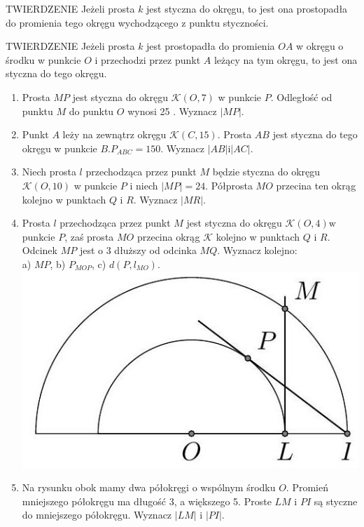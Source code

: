 \documentclass[10pt]{article}
\begin{document}
TWIERDZENIE Jeżeli prosta \(k\) jest styczna do okręgu, to jest ona prostopadła do promienia tego okręgu wychodzącego z punktu styczności.

TWIERDZENIE Jeżeli prosta \(k\) jest prostopadła do promienia \(O A\) w okręgu o środku w punkcie \(O\) i przechodzi przez punkt \(A\) leżący na tym okręgu, to jest ona styczna do tego okręgu.

\begin{enumerate}
  \item Prosta \(M P\) jest styczna do okręgu \(\mathcal{K}(O, 7)\) w punkcie \(P\). Odległość od punktu \(M\) do punktu \(O\) wynosi 25 . Wyznacz \(|M P|\).
  \item Punkt \(A\) leży na zewnątrz okręgu \(\mathcal{K}(C, 15)\). Prosta \(A B\) jest styczna do tego okręgu w punkcie \(B . P_{A B C}=150\). Wyznacz \(|A B| \mathrm{i}|A C|\).
  \item Niech prosta \(l\) przechodząca przez punkt \(M\) będzie styczna do okręgu \(\mathcal{K}(O, 10)\) w punkcie \(P\) i niech \(|M P|=24\). Półprosta \(M O\) przecina ten okrąg kolejno w punktach \(Q\) i \(R\). Wyznacz \(|M R|\).
  \item Prosta \(l\) przechodząca przez punkt \(M\) jest styczna do okręgu \(\mathcal{K}(O, 4) \mathrm{w}\) punkcie \(P\), zaś prosta \(M O\) przecina okrąg \(\mathcal{K}\) kolejno w punktach \(Q\) i \(R\). Odcinek \(M P\) jest o 3 dłuższy od odcinka \(M Q\). Wyznacz kolejno:\\
a) \(M P\), b) \(P_{M O P}\), c) \(d\left(P, l_{M O}\right)\).\\
\includegraphics[max width=\textwidth, center]{2024_11_21_e9b4faa005d5be2cc318g-033}
  \item Na rysunku obok mamy dwa półokręgi o wspólnym środku \(O\). Promień mniejszego półokręgu ma długość 3, a większego 5. Proste \(L M\) i \(P I\) są styczne do mniejszego półokręgu. Wyznacz \(|L M|\) i \(|P I|\).

\end{enumerate}
\end{document}
